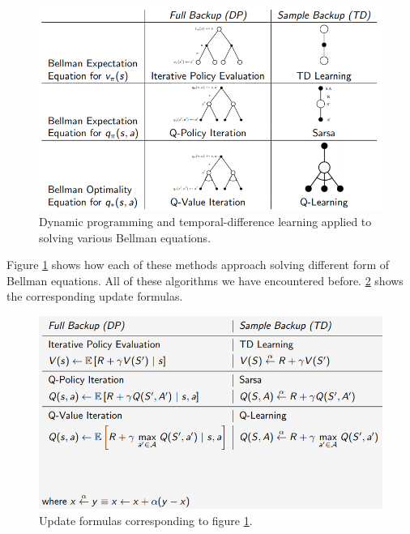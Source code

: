 \documentclass[12pt, a4paper]{article}
\numberwithin{equation}{section}
\begin{document}
\begin{figure}
\centering
\includegraphics[width=\textwidth]{DPvsTD}
\caption{Dynamic programming and temporal-difference learning applied to solving various Bellman equations.}
\label{fig:DPvsTD}
\end{figure}

Figure \ref{fig:DPvsTD} shows how each of these methods approach solving different form of Bellman equations. All of these algorithms we have encountered before. \ref{fig:DPvsTD2} shows the corresponding update formulas.

\begin{figure}
\centering
\includegraphics[width=\textwidth]{DPvsTD2}
\caption{Update formulas corresponding to figure \ref{fig:DPvsTD}.}
\label{fig:DPvsTD2}
\end{figure}
\end{document}

